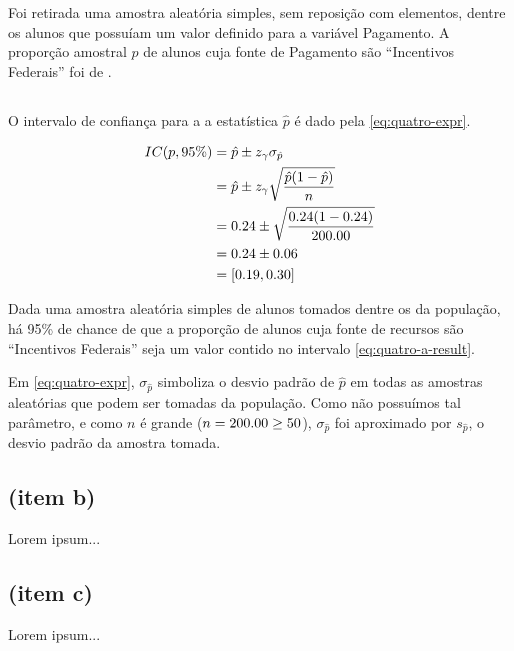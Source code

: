 

Foi retirada uma amostra aleatória simples, sem reposição com \QUATROn elementos, dentre os \QUATRON alunos que possuíam um valor definido para a variável Pagamento. A proporção amostral $\hat{p}$ de alunos cuja fonte de Pagamento são ``Incentivos Federais'' foi de \QUATROpAmostral.

\subsection{}
O intervalo de confiança para a a estatística $\hat{p}$ é dado pela \autoref{eq:quatro-expr}.

\begin{align} 
	IC(p, 95\%) \label{eq:quatro-expr}
	            &= \hat{p} \pm z_\gamma \sigma_{\hat{p}} \\
	            \label{eq:quatro-estim}
	            &= \hat{p} \pm z_\gamma \sqrt{\frac{\hat{p}(1-\hat{p})}{n}} \\
	            &= 0.24 \pm \sqrt{\frac{0.24 (1- 0.24)}{200.00}} \nonumber \\
	            &= 0.24 \pm 0.06 \nonumber \\
	            \label{eq:quatro-a-result}
	            &= [0.19, 0.30]
\end{align}

Dada uma amostra aleatória simples de \QUATROn alunos tomados dentre os \QUATRON da população, há 95\% de chance de que a proporção de alunos cuja fonte de recursos são ``Incentivos Federais'' seja um valor contido no intervalo \eqref{eq:quatro-a-result}.

Em \eqref{eq:quatro-expr}, $\sigma_{\hat{p}}$ simboliza o desvio padrão de $\hat{p}$ em todas as amostras aleatórias que podem ser tomadas da população. Como não possuímos tal parâmetro, e como $n$ é grande ($n = 200.00 \geq 50$), $\sigma_{\hat{p}}$ foi aproximado por $s_{\hat{p}}$, o desvio padrão da amostra tomada.

\subsection{(item b)}
Lorem ipsum...

\subsection{(item c)}
Lorem ipsum...